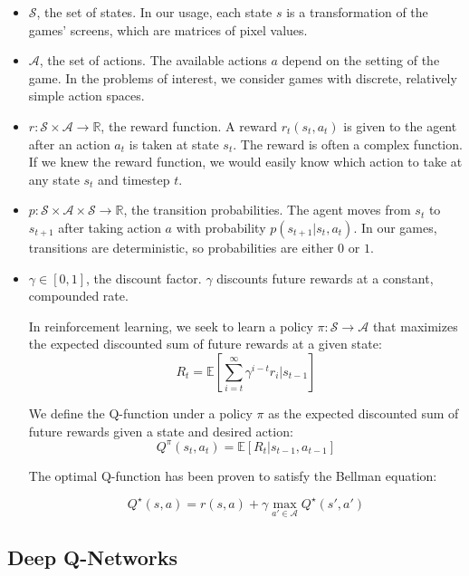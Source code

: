 \documentclass[11pt]{article}
\begin{document}
\begin{itemize}
\item $\mathcal{S}$, the set of states. In our usage, each state $s$
is a transformation of the games' screens, which are matrices of pixel
values.
  
\item $\mathcal{A}$, the set of actions. The available actions $a$
depend on the setting of the game. In the problems of interest, we
consider games with discrete, relatively simple action spaces.
  
\item $r: \mathcal{S} \times \mathcal{A} \to \mathbb{R}$, the reward
function. A reward $r_t(s_t, a_t)$ is given to the agent after an
action $a_t$ is taken at state $s_t$. The reward is often a complex
function. If we knew the reward function, we would easily know which
action to take at any state $s_t$ and timestep $t$.
  
\item $p: \mathcal{S} \times \mathcal{A} \times \mathcal{S} \to
\mathbb{R}$, the transition probabilities. The agent moves from $s_t$
to $s_{t+1}$ after taking action $a$ with probability $p(s_{t+1} |s_t,
a_t)$. In our games, transitions are deterministic, so probabilities
are either $0$ or $1$.
  
\item $\gamma \in [0, 1]$, the discount factor. $\gamma$ discounts
  future rewards at a constant, compounded rate.

  In reinforcement learning, we seek to learn a policy
  $\pi: \mathcal{S} \to \mathcal{A}$ that maximizes the expected
  discounted sum of future rewards at a given
  state:
  $$R_t = \mathbb{E}\left[\sum_{i=t}^\infty \gamma^{i-t} r_{i}|s_{t-1}\right]$$

  We define the Q-function under a policy $\pi$ as the expected
  discounted sum of future rewards given a state and desired action:
  $$Q^\pi(s_t, a_t) = \mathbb{E}\left[R_t | s_{t-1}, a_{t-1} \right]$$

  The optimal Q-function has been proven to satisfy the Bellman equation:

  $$Q^\star (s, a) = r(s, a) + \gamma \max_{a' \in \mathcal{A}} Q^\star(s', a')$$
\end{itemize}


\subsection{Deep Q-Networks}
\end{document}
